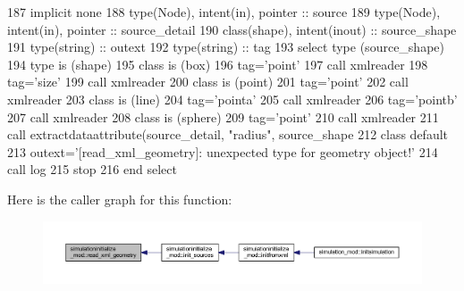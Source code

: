 \begin{DoxyCode}
187     \textcolor{keywordtype}{implicit none}
188     \textcolor{keywordtype}{type}(Node), \textcolor{keywordtype}{intent(in)}, \textcolor{keywordtype}{pointer} :: source
189     \textcolor{keywordtype}{type}(Node), \textcolor{keywordtype}{intent(in)}, \textcolor{keywordtype}{pointer} :: source\_detail
190     \textcolor{keywordtype}{class}(shape), \textcolor{keywordtype}{intent(inout)} :: source\_shape
191     \textcolor{keywordtype}{type}(string) :: outext
192     \textcolor{keywordtype}{type}(string) :: tag
193     \textcolor{keywordflow}{select type} (source\_shape)
194 \textcolor{keywordflow}{    type is} (shape)
195 \textcolor{keywordflow}{    class is} (box)
196         tag=\textcolor{stringliteral}{'point'}
197         \textcolor{keyword}{call }xmlreader%
198         tag=\textcolor{stringliteral}{'size'}
199         \textcolor{keyword}{call }xmlreader%
200 \textcolor{keywordflow}{    class is} (point)
201         tag=\textcolor{stringliteral}{'point'}
202         \textcolor{keyword}{call }xmlreader%
203 \textcolor{keywordflow}{    class is} (line)
204         tag=\textcolor{stringliteral}{'pointa'}
205         \textcolor{keyword}{call }xmlreader%
206         tag=\textcolor{stringliteral}{'pointb'}
207         \textcolor{keyword}{call }xmlreader%
208 \textcolor{keywordflow}{    class is} (sphere)
209         tag=\textcolor{stringliteral}{'point'}
210         \textcolor{keyword}{call }xmlreader%
211         \textcolor{keyword}{call }extractdataattribute(source\_detail, \textcolor{stringliteral}{"radius"}, source\_shape%
212 \textcolor{keywordflow}{        class default}
213         outext=\textcolor{stringliteral}{'[read\_xml\_geometry]: unexpected type for geometry object!'}
214         \textcolor{keyword}{call }log%
215         stop
216 \textcolor{keywordflow}{    end select}
\end{DoxyCode}
Here is the caller graph for this function\+:\nopagebreak
\begin{figure}[H]
\begin{center}
\leavevmode
\includegraphics[width=350pt]{namespacesimulationinitialize__mod_ab65ac868a57f2cc124ec29f87a239424_icgraph}
\end{center}
\end{figure}
